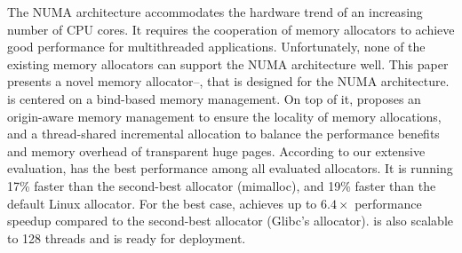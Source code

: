 The NUMA architecture accommodates the hardware trend of an increasing number of CPU cores. It requires the cooperation of memory allocators to achieve good performance for multithreaded applications. Unfortunately, none of the existing memory allocators can support the NUMA architecture well.
This paper presents a novel memory allocator--\NM{}, that is designed for the NUMA architecture. \NM{} is centered on a bind-based memory management. On top of it, \NM{} proposes an origin-aware memory management to ensure the locality of memory allocations, and a thread-shared incremental allocation to balance the performance benefits and memory overhead of transparent huge pages. 
According to our extensive evaluation, \NM{} has the best performance among all evaluated allocators. It is running 17\% faster than the second-best allocator (mimalloc), and 19\% faster than the default Linux allocator. For the best case, \NM{} achieves up to $6.4\times$ performance speedup compared to the second-best allocator (Glibc's allocator). \NM{} is also scalable to 128 threads and is ready for deployment.
